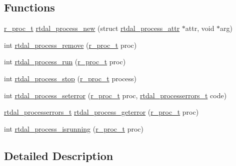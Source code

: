 \subsection*{Functions}
\begin{DoxyCompactItemize}
\item 
\hyperlink{rtdal__types_8h_a9a6d36a76828ee198254e7084107ca38}{r\-\_\-proc\-\_\-t} \hyperlink{group__process_gaac39f57d3d63eca01423a7ffd95026e1}{rtdal\-\_\-process\-\_\-new} (struct \hyperlink{structrtdal__process__attr}{rtdal\-\_\-process\-\_\-attr} $\ast$attr, void $\ast$arg)
\item 
int \hyperlink{group__process_ga07991d97b2fdf23217553f20237fd1e3}{rtdal\-\_\-process\-\_\-remove} (\hyperlink{rtdal__types_8h_a9a6d36a76828ee198254e7084107ca38}{r\-\_\-proc\-\_\-t} proc)
\item 
int \hyperlink{group__process_ga5c4d6fda8cbcf1f0721e894fde223173}{rtdal\-\_\-process\-\_\-run} (\hyperlink{rtdal__types_8h_a9a6d36a76828ee198254e7084107ca38}{r\-\_\-proc\-\_\-t} proc)
\item 
int \hyperlink{group__process_gace4d20da04ac45fbc04974ad0345f18b}{rtdal\-\_\-process\-\_\-stop} (\hyperlink{rtdal__types_8h_a9a6d36a76828ee198254e7084107ca38}{r\-\_\-proc\-\_\-t} process)
\item 
int \hyperlink{group__process_ga62e8e5fe2fcbd59cfaf533663588e220}{rtdal\-\_\-process\-\_\-seterror} (\hyperlink{rtdal__types_8h_a9a6d36a76828ee198254e7084107ca38}{r\-\_\-proc\-\_\-t} proc, \hyperlink{group__process_ga825233f1e8a1bd1e1eb99e1301f36a57}{rtdal\-\_\-processerrors\-\_\-t} code)
\item 
\hyperlink{group__process_ga825233f1e8a1bd1e1eb99e1301f36a57}{rtdal\-\_\-processerrors\-\_\-t} \hyperlink{group__process_ga7d0ff5bc88da30e358e83fcf8485ea45}{rtdal\-\_\-process\-\_\-geterror} (\hyperlink{rtdal__types_8h_a9a6d36a76828ee198254e7084107ca38}{r\-\_\-proc\-\_\-t} proc)
\item 
int \hyperlink{group__process_ga7aea1116fc59481d09d02adad13ec5db}{rtdal\-\_\-process\-\_\-isrunning} (\hyperlink{rtdal__types_8h_a9a6d36a76828ee198254e7084107ca38}{r\-\_\-proc\-\_\-t} proc)
\end{DoxyCompactItemize}


\subsection{Detailed Description}


